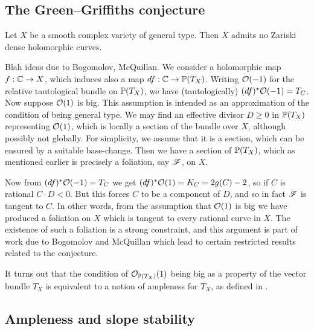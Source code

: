 

\subsection{The Green--Griffiths conjecture}


\begin{conjecture}
    Let $X$ be a smooth complex variety of general type. Then $X$ admits no
    Zariski dense holomorphic curves.
\end{conjecture}

Blah ideas due to Bogomolov, McQuillan. We consider a holomorphic map
$f:\C\to X$, which induces also a map $df:\C\to\P(T_X)$. Writing $\O(-1)$ for
the relative tautological bundle on $\P(T_X)$, we have (tautologically)
$(df)^*\O(-1)=T_C$. Now suppose $\O(1)$ is big. %
This assumption is intended as an approximation of the condition of being
general type. We may find an effective divisor $D\ge0$ in $\P(T_X)$ representing
$\O(1)$, which is locally a section of the bundle over $X$, although possibly
not globally. For simplicity, we assume that it is a section, which can be
ensured by a suitable base-change. Then we have a section of $\P(T_X)$, which as
mentioned earlier is precisely a foliation, say $\scrF$, on $X$.

Now from $(df)^*\O(-1)=T_C$ we get $(df)^*\O(1)=K_C=2g(C)-2$, so if $C$ is
rational $C\cdot D<0$. But this forces $C$ to be a component of $D$, and so in
fact $\scrF$ is tangent to $C$. %
In other words, from the assumption that $\O(1)$ is big we have produced a
foliation on $X$ which is tangent to every rational curve in $X$. The existence
of such a foliation is a strong constraint, and this argument is part of work
due to Bogomolov and McQuillan \cite{mcquillan_98} which lead to certain
restricted results related to the conjecture.

It turns out that the condition of $\O_{\P(T_X)}(1)$ being big as a property of
the vector bundle $T_X$ is equivalent to a notion of ampleness for $T_X$, as
defined in \cite{hartshorne_66}. %

\subsection{Ampleness and slope stability}


